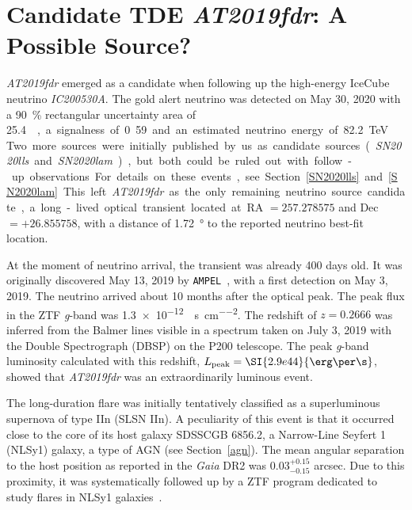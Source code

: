 \chapter{Candidate TDE \emph{AT2019fdr}: A Possible Source?}\label{at2019fdr}
\emph{AT2019fdr} emerged as a candidate when following up the high-energy IceCube neutrino \emph{IC200530A}. The gold alert neutrino was detected on May 30, 2020 with a \SI{90}{\percent} rectangular uncertainty area of \SI{25.4}{\square\deg}, a signalness of 0.59 and an estimated neutrino energy of \SI{82.2}{\tera\eV}~\cite{IC200530A1}.

Two more sources were initially published by us as candidate sources (\textit{SN2020lls} and \textit{SN2020lam}), but both could be ruled out with follow-up observations. For details on these events, see Section~\ref{SN2020lls} and~\ref{SN2020lam}. This left \emph{AT2019fdr} as the only remaining neutrino source candidate, a long-lived optical transient located at RA $= 257.278575$ and Dec $= +26.855758$, with a distance of \SI{1.72}{\degree} to the reported neutrino best-fit location.

At the moment of neutrino arrival, the transient was already 400 days old. It was originally discovered May 13, 2019 by \texttt{AMPEL}~, with a first detection on May 3, 2019. The neutrino arrived about 10 months after the optical peak. The peak flux in the ZTF \textit{g}-band was \SI{1.3e-12}{\erg\per\s\per\square\cm}. The redshift of $z=0.2666$ was inferred from the Balmer lines visible in a spectrum taken on July 3, 2019 with the Double Spectrograph (DBSP) on the P200 telescope. The peak \textit{g}-band luminosity calculated with this redshift, $L_\text{peak}=\SI{2.9e44}{\erg\per\s}$, showed that \emph{AT2019fdr} was an extraordinarily luminous event.

The long-duration flare was initially tentatively classified as a superluminous supernova of type IIn (SLSN IIn). A peculiarity of this event is that it occurred close to the core of its host galaxy SDSSCGB 6856.2, a Narrow-Line Seyfert 1 (NLSy1) galaxy, a type of AGN (see Section~\ref{agn}). The mean angular separation to the host position as reported in the \textit{Gaia} DR2 was $0.03^{+0.15}_{-0.15}$ arcsec. Due to this proximity, it was systematically followed up by a ZTF program dedicated to study flares in NLSy1 galaxies~.

